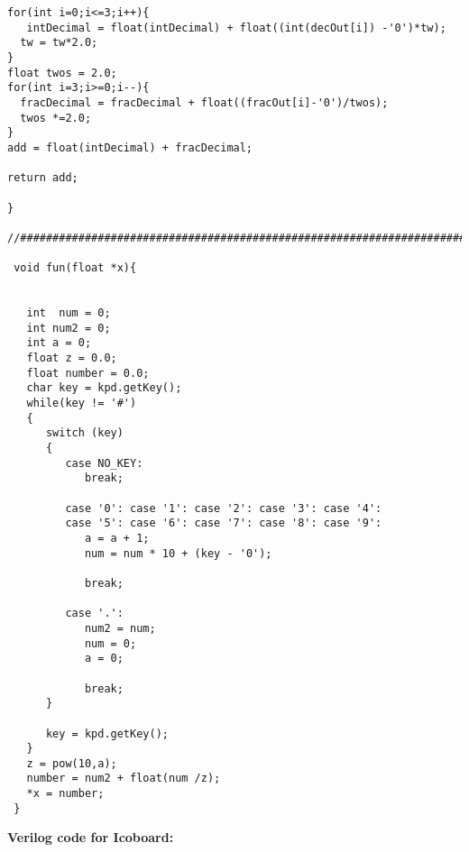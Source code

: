 \documentclass{article}
\begin{document}
\begin{lstlisting}[style=CStyle]
  for(int i=0;i<=3;i++){
   intDecimal = float(intDecimal) + float((int(decOut[i]) -'0')*tw);
  tw = tw*2.0;
}
float twos = 2.0;
for(int i=3;i>=0;i--){
  fracDecimal = fracDecimal + float((fracOut[i]-'0')/twos);
  twos *=2.0; 
}
add = float(intDecimal) + fracDecimal;

return add;

}

//#######################################################################

 void fun(float *x){
  
 
   int  num = 0;
   int num2 = 0;
   int a = 0;
   float z = 0.0;
   float number = 0.0;
   char key = kpd.getKey();
   while(key != '#')
   {
      switch (key)
      {
         case NO_KEY:
            break;
          
         case '0': case '1': case '2': case '3': case '4':
         case '5': case '6': case '7': case '8': case '9':
            a = a + 1;  
            num = num * 10 + (key - '0');
            
            break;

         case '.':
            num2 = num; 
            num = 0;
            a = 0;
          
            break;
      }

      key = kpd.getKey();
   }
   z = pow(10,a);
   number = num2 + float(num /z);
   *x = number;
 }
 \end{lstlisting}
 \bigskip 
 \bigskip 
 \bigskip 
 \bigskip 
\textbf{Verilog code for Icoboard:}
 \bigskip 
\end{document}
